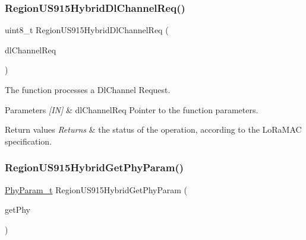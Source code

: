 \subsubsection{\texorpdfstring{Region\+U\+S915\+Hybrid\+Dl\+Channel\+Req()}{RegionUS915HybridDlChannelReq()}}
{\footnotesize\ttfamily uint8\+\_\+t Region\+U\+S915\+Hybrid\+Dl\+Channel\+Req (\begin{DoxyParamCaption}\item[{\hyperlink{group__REGION_gae0d608ff1f8ea0a430e4f9a4c38ec7f3}{Dl\+Channel\+Req\+Params\+\_\+t} $\ast$}]{dl\+Channel\+Req }\end{DoxyParamCaption})}



The function processes a Dl\+Channel Request. 


\begin{DoxyParams}{Parameters}
{\em \mbox{[}\+I\+N\mbox{]}} & dl\+Channel\+Req Pointer to the function parameters.\\
\hline
\end{DoxyParams}

\begin{DoxyRetVals}{Return values}
{\em Returns} & the status of the operation, according to the Lo\+Ra\+M\+AC specification. \\
\hline
\end{DoxyRetVals}
\mbox{\label{group__REGIONUS915HYB_gaf078bd0d293c1a677ca53b7b6ca96c6e}} 
\subsubsection{\texorpdfstring{Region\+U\+S915\+Hybrid\+Get\+Phy\+Param()}{RegionUS915HybridGetPhyParam()}}
{\footnotesize\ttfamily \hyperlink{group__REGION_gaed159b26e5c4677236b6e8677019db30}{Phy\+Param\+\_\+t} Region\+U\+S915\+Hybrid\+Get\+Phy\+Param (\begin{DoxyParamCaption}\item[{\hyperlink{group__REGION_gab471483fff904f4f89bbc03f7fc380ab}{Get\+Phy\+Params\+\_\+t} $\ast$}]{get\+Phy }\end{DoxyParamCaption})}



